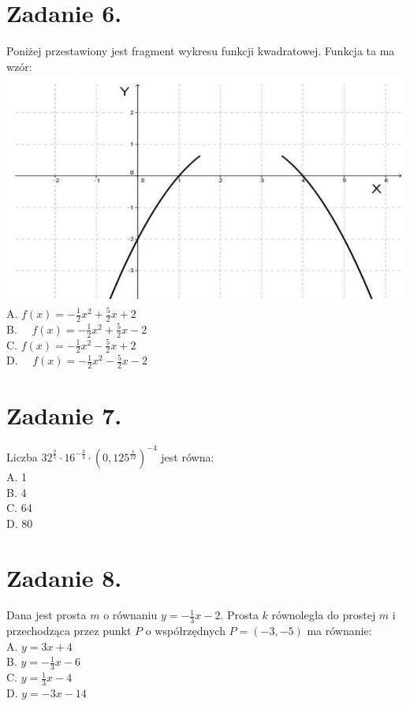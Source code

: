 \documentclass[10pt]{article}
\begin{document}
\section*{Zadanie 6.}
Poniżej przestawiony jest fragment wykresu funkcji kwadratowej. Funkcja ta ma wzór:\\
\includegraphics[max width=\textwidth, center]{2024_11_21_94f02db55673a8a7b820g-04}\\
A. \(f(x)=-\frac{1}{2} x^{2}+\frac{5}{2} x+2\)\\
B. \(\quad f(x)=-\frac{1}{2} x^{2}+\frac{5}{2} x-2\)\\
C. \(f(x)=-\frac{1}{2} x^{2}-\frac{5}{2} x+2\)\\
D. \(\quad f(x)=-\frac{1}{2} x^{2}-\frac{5}{2} x-2\)

\section*{Zadanie 7.}
Liczba \(32^{\frac{2}{5}} \cdot 16^{-\frac{3}{4}} \cdot\left(0,125^{\frac{1}{12}}\right)^{-4}\) jest równa:\\
A. 1\\
B. 4\\
C. 64\\
D. 80

\section*{Zadanie 8.}
Dana jest prosta \(m\) o równaniu \(y=-\frac{1}{3} x-2\). Prosta \(k\) równoległa do prostej \(m\) i przechodząca przez punkt \(P\) o współrzędnych \(P=(-3,-5)\) ma równanie:\\
A. \(y=3 x+4\)\\
B. \(y=-\frac{1}{3} x-6\)\\
C. \(y=\frac{1}{3} x-4\)\\
D. \(y=-3 x-14\)
\end{document}
